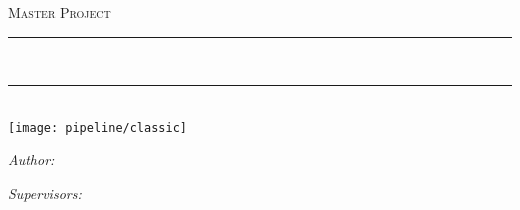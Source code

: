 
\begin{titlepage}
    \begin{center}
        \vspace*{.15\textheight}
        \begin{figure}[h]
            \centering
            \def\svgwidth{0.4\textwidth}
            
        \end{figure}
        \vspace*{1.5cm}
        \textsc{\Large Master Project}\\[0.5cm] %

        \rule{.9\linewidth}{.6pt} \\[0.5cm]
        {\huge \bfseries \ttitle\par}\vspace{0.4cm} %
        \rule{.9\linewidth}{.6pt} \\[0.5cm]
        \vfill
        {\centering \texttt{[image: pipeline/classic]}}
        \vfill
        \begin{minipage}[t]{0.4\textwidth}
            \begin{flushleft} \large
                \emph{Author:}\\
                \authorname
            \end{flushleft}
        \end{minipage}
        \begin{minipage}[t]{0.4\textwidth}
            \begin{flushright} \large
                \emph{Supervisors:} \\
                \supname %
            \end{flushright}
        \end{minipage}\\[3cm]
    \end{center}
\end{titlepage}
